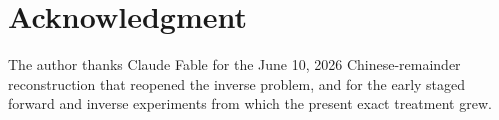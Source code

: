 \section*{Acknowledgment}

The author thanks Claude Fable for the June 10, 2026 Chinese-remainder
reconstruction that reopened the inverse problem, and for the early staged
forward and inverse experiments from which the present exact treatment grew.
